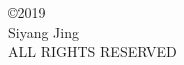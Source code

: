 
\begin{center}
\begin{singlespace}
\copyright 2019\\
Siyang Jing \\
ALL RIGHTS RESERVED
\end{singlespace}
\end{center}

\clearpage
